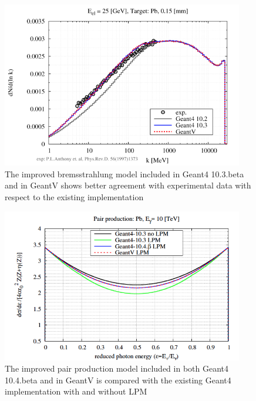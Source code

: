 \documentclass[12pt,a4paper]{article}
\begin{document}
\begin{figure}[bthp]
\centering
\includegraphics[width=0.94\textwidth]{image6.png}
\caption{The improved bremsstrahlung model included in Geant4
10.3.beta and in GeantV shows better agreement with experimental data
with respect to the existing implementation}
\label{fig:brem}
\end{figure}

\begin{figure}[bthp]
\centering
\includegraphics[width=0.94\textwidth]{image7.png}
\caption{The improved pair production model included in both
Geant4 10.4.beta and in GeantV is compared with the existing Geant4
implementation with and without LPM}
\label{fig:ppm}
\end{figure}
\end{document}
